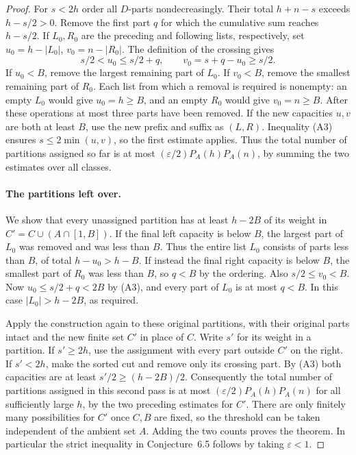 \documentclass[11pt,a4paper]{article}
\numberwithin{equation}{section}
\begin{document}
\begin{proof}
For $s<2h$ order all $D$-parts nondecreasingly. Their total
$h+n-s$ exceeds $h-s/2>0$. Remove the first part $q$ for which
the cumulative sum reaches $h-s/2$. If $L_0,R_0$ are the preceding
and following lists, respectively, set $u_0=h-|L_0|$,
$v_0=n-|R_0|$. The definition of the crossing gives
\[
    s/2<u_0\le s/2+q,\qquad v_0=s+q-u_0\ge s/2.
\tag{A3}
\]
If $u_0<B$, remove the largest remaining part of $L_0$. If $v_0<B$,
remove the smallest remaining part of $R_0$. Each list from which
a removal is required is nonempty: an empty $L_0$ would give
$u_0=h\ge B$, and an empty $R_0$ would give $v_0=n\ge B$.
After these operations at most three parts have been removed.
If the new capacities $u,v$ are both at least $B$, use the new
prefix and suffix as $(L,R)$. Inequality (A3) ensures
$s\le2\min(u,v)$, so the first estimate applies.
Thus the total number of partitions assigned so far is at most
$(\varepsilon/2)P_A(h)P_A(n)$, by summing the two estimates over
all classes.

\paragraph{The partitions left over.}
We show that every unassigned partition has at least $h-2B$ of its
weight in $C'=C\cup(A\cap[1,B])$. If the final left capacity is
below $B$, the largest part of $L_0$ was removed and was less than
$B$. Thus the entire list $L_0$ consists of parts less than $B$,
of total $h-u_0>h-B$. If instead the final right capacity is below
$B$, the smallest part of $R_0$ was less than $B$, so $q<B$ by
the ordering. Also $s/2\le v_0<B$. Now $u_0\le s/2+q<2B$
by (A3), and every part of $L_0$ is at most $q<B$. In this case
$|L_0|>h-2B$, as required.

Apply the construction again to these original partitions, with their
original parts intact and the new finite set $C'$ in place of $C$.
Write $s'$ for its weight in a partition. If $s'\ge2h$, use the
assignment with every part outside $C'$ on the right. If $s'<2h$,
make the sorted cut and remove only its crossing part.
By (A3) both capacities are at least $s'/2\ge(h-2B)/2$.
Consequently the total number of partitions assigned in this second
pass is at most $(\varepsilon/2)P_A(h)P_A(n)$ for all sufficiently
large $h$, by the two preceding estimates for $C'$. There are
only finitely many possibilities for $C'$ once $C,B$ are fixed,
so the threshold can be taken independent of the ambient set $A$.
Adding the two counts proves the theorem. In particular the strict
inequality in Conjecture~6.5 follows by taking $\varepsilon<1$.
\end{proof}
\end{document}

